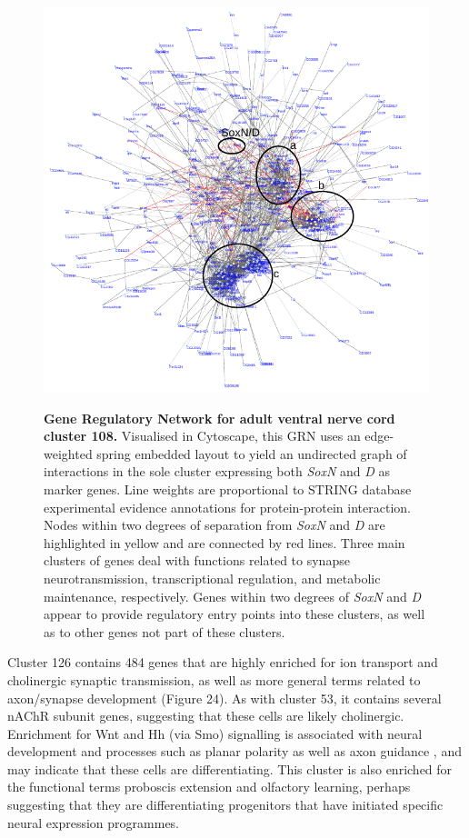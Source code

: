 \documentclass[withindex,glossary]{cam-thesis}
\begin{document}
\setcounter{figure}{27-1}
\begin{figure}[!htbp]
\centering
\includegraphics[width=\textwidth]{figs/Fig27 Network v2}
\label{fig27}
\caption{\textbf{Gene Regulatory Network for adult ventral nerve cord cluster 108.} Visualised in Cytoscape, this GRN uses an edge-weighted spring embedded layout to yield an undirected graph of interactions in the sole cluster expressing both \emph{SoxN} and \emph{D} as marker genes. Line weights are proportional to STRING database experimental evidence annotations for protein-protein interaction. Nodes within two degrees of separation from \emph{SoxN} and \emph{D} are highlighted in yellow and are connected by red lines. Three main clusters of genes deal with functions related to synapse neurotransmission, transcriptional regulation, and metabolic maintenance, respectively. Genes within two degrees of \emph{SoxN} and \emph{D} appear to provide regulatory entry points into these clusters, as well as to other genes not part of these clusters.}
\end{figure}

Cluster 126 contains 484 genes that are highly enriched for ion
transport and cholinergic synaptic transmission, as well as more general
terms related to axon/synapse development (Figure 24). As with cluster
53, it contains several nAChR subunit genes, suggesting that these cells
are likely cholinergic. Enrichment for Wnt and Hh (via Smo) signalling
is associated with neural development and processes such as planar
polarity  as well as axon guidance , and may indicate that these cells are
differentiating. This cluster is also enriched for the functional terms
proboscis extension and olfactory learning, perhaps suggesting that they
are differentiating progenitors that have initiated specific neural
expression programmes.
\end{document}

